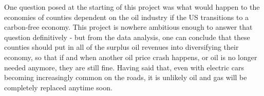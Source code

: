 \documentclass[11pt,letterpaper]{article}
\begin{document}
One question posed at the starting of this project was what would happen to the economies of counties dependent on the oil industry if the US transitions to a carbon-free economy. This project is nowhere ambitious enough to answer that question definitively - but from the data analysis, one can conclude that these counties should put in all of the surplus oil revenues into diversifying their economy, so that if and when another oil price crash happens, or oil is no longer needed anymore, they are still fine. Having said that, even with electric cars becoming increasingly common on the roads, it is unlikely oil and gas will be completely replaced anytime soon.
\end{document}
